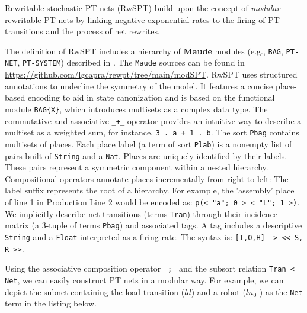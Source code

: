 Rewritable stochastic PT nets (RwSPT) build upon the concept of \emph{modular} rewritable PT nets \cite{CAPRA-TCS2024} by linking negative exponential rates to the firing of PT transitions and the process of net rewrites.

The definition of RwSPT includes a hierarchy of \textbf{Maude} modules (e.g., \texttt{BAG}, \texttt{PT-NET}, \texttt{PT-SYSTEM}) described in  \cite{CAPRA-TCS2024}.
The \texttt{Maude} sources can be found in \url{https://github.com/lgcapra/rewpt/tree/main/modSPT}.
RwSPT uses structured annotations to underline the symmetry of the model. It features a concise place-based encoding to aid in state canonization and is based on the functional module \verb|BAG{X}|, which introduces multisets as a complex data type. The commutative and associative \verb|_+_| operator provides an intuitive way to describe a multiset as a weighted sum, for instance, \verb|3 . a + 1 . b|. The sort \verb|Pbag| contains multisets of places.
Each place label (a term of sort \verb|Plab|) is a nonempty list of pairs built of \verb|String| and a \verb|Nat|. Places are uniquely identified by their labels. These pairs represent a symmetric component within a nested hierarchy. Compositional operators annotate places incrementally from right to left: The label suffix represents the root of a hierarchy. 
For example, the 'assembly' place of line 1 in Production Line 2 would be encoded as:
\verb|p(< "a"; 0 > < "L"; 1 >)|.     
We implicitly describe net transitions (terms \verb |Tran|) through their incidence matrix (a 3-tuple of terms \verb|Pbag|) and associated tags. A tag includes a descriptive \verb|String|
and a \verb |Float| interpreted as a firing rate. 
The syntax is:
\verb|[I,O,H] -> << S, R >>|. 

Using the associative composition operator \verb"_;_" and the subsort relation \verb"Tran < Net", we can easily construct PT nets in a modular way. For example, we can depict the subnet containing the load transition ($ld$) and a robot ($ln_0$ ) as the \verb"Net" term in the listing below.


